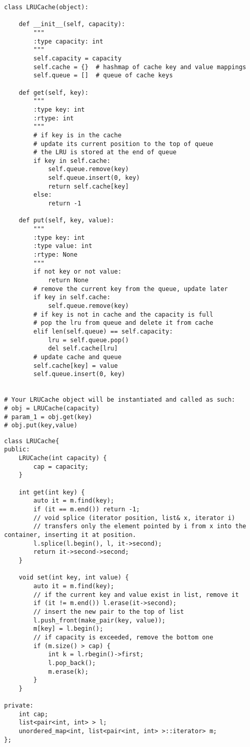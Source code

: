 \begin{lstlisting}
class LRUCache(object):

    def __init__(self, capacity):
        """
        :type capacity: int
        """
        self.capacity = capacity
        self.cache = {}  # hashmap of cache key and value mappings
        self.queue = []  # queue of cache keys
        
    def get(self, key):
        """
        :type key: int
        :rtype: int
        """
        # if key is in the cache
        # update its current position to the top of queue
        # the LRU is stored at the end of queue
        if key in self.cache:
            self.queue.remove(key)
            self.queue.insert(0, key)
            return self.cache[key]
        else:
            return -1

    def put(self, key, value):
        """
        :type key: int
        :type value: int
        :rtype: None
        """
        if not key or not value: 
            return None
        # remove the current key from the queue, update later
        if key in self.cache:
            self.queue.remove(key)
        # if key is not in cache and the capacity is full
        # pop the lru from queue and delete it from cache
        elif len(self.queue) == self.capacity:
            lru = self.queue.pop()
            del self.cache[lru]
        # update cache and queue
        self.cache[key] = value
        self.queue.insert(0, key)


# Your LRUCache object will be instantiated and called as such:
# obj = LRUCache(capacity)
# param_1 = obj.get(key)
# obj.put(key,value)
\end{lstlisting}

\begin{lstlisting}
class LRUCache{
public:
    LRUCache(int capacity) {
        cap = capacity;
    }
    
    int get(int key) {
        auto it = m.find(key);
        if (it == m.end()) return -1;
        // void splice (iterator position, list& x, iterator i)
        // transfers only the element pointed by i from x into the container, inserting it at position.
        l.splice(l.begin(), l, it->second);
        return it->second->second;
    }
    
    void set(int key, int value) {
        auto it = m.find(key);
        // if the current key and value exist in list, remove it
        if (it != m.end()) l.erase(it->second);
        // insert the new pair to the top of list
        l.push_front(make_pair(key, value)); 
        m[key] = l.begin();
        // if capacity is exceeded, remove the bottom one
        if (m.size() > cap) {
            int k = l.rbegin()->first;
            l.pop_back();
            m.erase(k);
        }
    }
    
private:
    int cap;
    list<pair<int, int> > l;
    unordered_map<int, list<pair<int, int> >::iterator> m;
};
\end{lstlisting}


